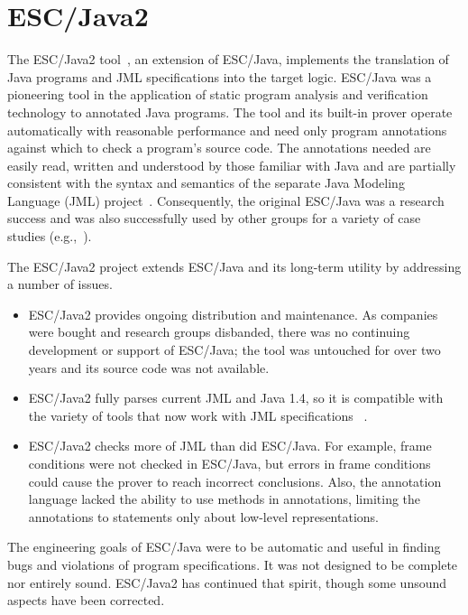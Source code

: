 \documentclass{sig-alternate}
\begin{document}
\section{ESC/Java2}

The ESC/Java2 tool~\cite{CokKiniry04}, an extension of ESC/Java,
 implements the translation of Java programs and JML specifications into
the target logic.   
ESC/Java
 was a pioneering tool in the
application of static program analysis and verification technology to
annotated Java programs.  The tool and its built-in
prover operate automatically with reasonable performance and need
only program annotations against which to check a program's source
code.  The annotations needed are easily read, written and understood
by those familiar with Java and are partially consistent with the syntax
and semantics of the separate Java Modeling Language (JML)
project~\cite{jmlpapers,Leavens-etal00}.  Consequently, the original
ESC/Java was a research success
and was also successfully used by other groups for a variety of case
studies (e.g.,~\cite{Hub03,HOP04}).

The ESC/Java2 project extends ESC/Java
and its long-term utility by addressing a number of issues.
\setlength{\partopsep}{0in}\setlength{\parskip}{0in}\setlength{\itemsep}{0in}\setlength{\topsep}{0in}
\begin{itemize}
\setlength{\partopsep}{0in}\setlength{\parskip}{0in}\setlength{\itemsep}{0in}\setlength{\topsep}{0in}\item ESC/Java2 provides ongoing distribution and maintenance.
As companies were bought and research groups
disbanded, there was no continuing development or support of 
ESC/Java; the tool was untouched for over two years and its
source code was not available. 
\item ESC/Java2 fully parses current JML and Java 1.4, so it is
compatible with the variety of tools that now work with JML specifications
~\cite{jmlpapers}.

\item ESC/Java2 checks more of JML than did ESC/Java.
For example, frame conditions were not checked in ESC/Java, but errors in frame
conditions could cause the prover to reach incorrect conclusions.
Also, the annotation language lacked the ability to use methods in
annotations, limiting the annotations to statements only about
low-level representations.
\end{itemize}

The engineering goals of ESC/Java were to be automatic and useful in finding bugs
and violations of program specifications.  It was not designed to be complete nor
entirely sound.  ESC/Java2 has continued that spirit, though some unsound aspects have
been corrected.
\end{document}
